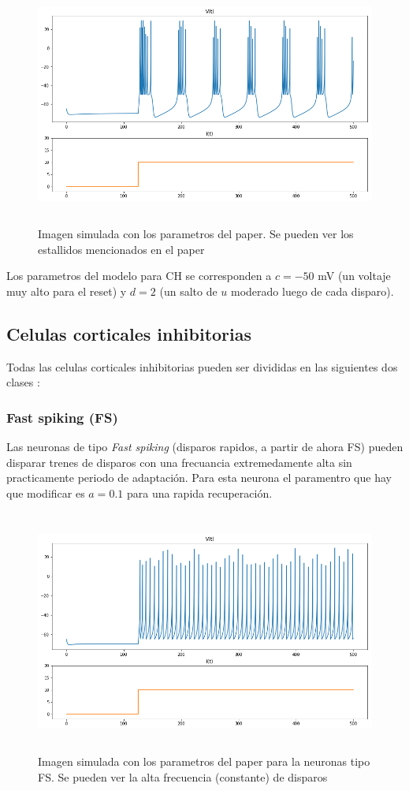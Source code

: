 \documentclass[12pt]{article}
\begin{document}
 \begin{figure}[h!]
    \centering
        \includegraphics[height=8cm]{images/CH.png}
    \caption[fontsize=2pt]{Imagen simulada con los parametros del paper. Se pueden ver los estallidos mencionados en el paper}
\end{figure}

Los parametros del modelo para CH se corresponden a $c = -50$ mV (un voltaje muy alto para el reset) y $d = 2$ (un salto de $u$ moderado luego de cada disparo).

\subsection{Celulas corticales inhibitorias}
Todas las celulas corticales inhibitorias pueden ser divididas en las siguientes dos clases \cite{inhibitorias}:

\subsubsection{Fast spiking (FS)}
Las neuronas de tipo \textit{Fast spiking} (disparos rapidos, a partir de ahora FS) pueden disparar trenes de disparos con una frecuancia extremedamente alta sin practicamente periodo de adaptación.
Para esta neurona el paramentro que hay que modificar es $a = 0.1$ para una rapida recuperación.

\begin{figure}[h!]
    \centering
        \includegraphics[height=8cm]{images/FS.png}
    \caption[fontsize=2pt]{Imagen simulada con los parametros del paper para la neuronas tipo FS. Se pueden ver la alta frecuencia (constante) de disparos}
\end{figure}
\end{document}
